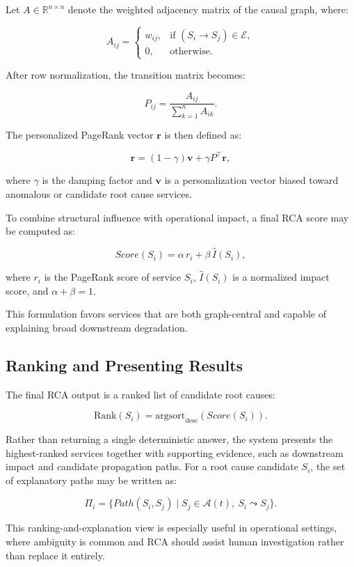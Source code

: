 Let $A \in \mathbb{R}^{n \times n}$ denote the weighted adjacency matrix of the 
causal graph, where:

\[
A_{ij} =
\begin{cases}
w_{ij}, & \text{if } (S_i \to S_j) \in \mathcal{E}, \\
0, & \text{otherwise.}
\end{cases}
\]

After row normalization, the transition matrix becomes:

\[
P_{ij} = \frac{A_{ij}}{\sum_{k=1}^{n} A_{ik}}.
\]

The personalized PageRank vector $\mathbf{r}$ is then defined as:

\[
\mathbf{r} = (1-\gamma)\mathbf{v} + \gamma P^\top \mathbf{r},
\]

where $\gamma$ is the damping factor and $\mathbf{v}$ is a personalization vector 
biased toward anomalous or candidate root cause services.

To combine structural influence with operational impact, a final RCA score may be 
computed as:

\[
Score(S_i) = \alpha \, r_i + \beta \, \hat{I}(S_i),
\]

where $r_i$ is the PageRank score of service $S_i$, $\hat{I}(S_i)$ is a 
normalized impact score, and $\alpha + \beta = 1$.

This formulation favors services that are both graph-central and capable of 
explaining broad downstream degradation.

\subsection{Ranking and Presenting Results}
\label{subsec:rca_ranking}

The final RCA output is a ranked list of candidate root causes:

\[
\text{Rank}(S_i) = \text{argsort}_{\text{desc}}(Score(S_i)).
\]

Rather than returning a single deterministic answer, the system presents the 
highest-ranked services together with supporting evidence, such as downstream 
impact and candidate propagation paths. For a root cause candidate $S_i$, the set 
of explanatory paths may be written as:

\[
\Pi_i = \{ Path(S_i, S_j) \mid S_j \in \mathcal{A}(t),\ S_i \leadsto S_j \}.
\]

This ranking-and-explanation view is especially useful in operational settings, 
where ambiguity is common and RCA should assist human investigation rather than 
replace it entirely.

